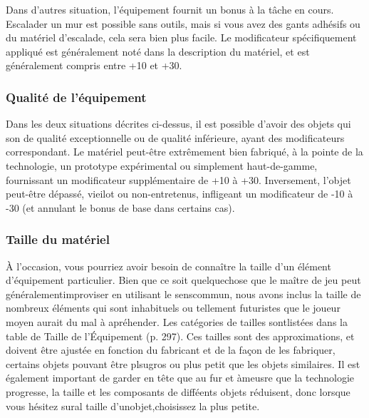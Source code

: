 Dans d'autres situation, l'équipement fournit un bonus à la tâche en cours. Escalader un mur est possible sans outils, mais si vous avez des gants adhésifs ou du matériel d'escalade, cela sera bien plus facile. Le modificateur spécifiquement appliqué est généralement noté dans la description du matériel, et est généralement compris entre +10 et +30. 

\subsubsection{Qualité de l'équipement} 

Dans les deux situations décrites ci-dessus, il est possible d'avoir des objets qui son de qualité exceptionnelle ou de qualité inférieure, ayant des modificateurs correspondant. Le matériel peut-être extrêmement bien fabriqué, à la pointe de la technologie, un prototype expérimental ou simplement haut-de-gamme, fournissant un modificateur supplémentaire de +10 à +30. Inversement, l'objet peut-être dépassé, vieilot ou non-entretenus, infligeant un modificateur de -10 à -30 (et annulant le bonus de base dans certains cas). 

\subsubsection{Taille du matériel} 

À l'occasion, vous pourriez avoir besoin de connaître la taille d'un élément d'équipement particulier. Bien que ce soit quelquechose que le maître de jeu peut généralementimproviser en utilisant le senscommun, nous avons inclus la taille de nombreux éléments qui sont inhabituels ou tellement futuristes que le joueur moyen aurait du mal à apréhender. Les catégories de tailles sontlistées dans la table de Taille de l'Équipement (p. 297). Ces tailles sont des approximations, et doivent être ajustée en fonction du fabricant et de la façon de les fabriquer, certains objets pouvant être plsugros ou plus petit que les objets similaires. Il est également important de garder en tête que au fur et àmeusre que la technologie progresse, la taille et les composants de difféents objets réduisent, donc lorsque vous hésitez sural taille d'unobjet,choisissez la plus petite. 

